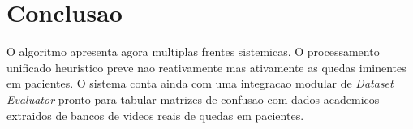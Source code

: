 \documentclass[12pt,a4paper]{article}
\begin{document}
\section{Conclusao}
O algoritmo apresenta agora multiplas frentes sistemicas. O processamento unificado heuristico preve nao reativamente mas ativamente as quedas iminentes em pacientes. O sistema conta ainda com uma integracao modular de \textit{Dataset Evaluator} pronto para tabular matrizes de confusao com dados academicos extraidos de bancos de videos reais de quedas em pacientes.
\end{document}

